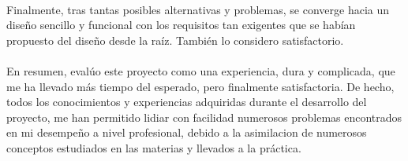 \paragraph{}
Finalmente, tras tantas posibles alternativas y problemas, se converge hacia un diseño sencillo y funcional con los requisitos tan exigentes que se habían propuesto del diseño desde la raíz. 
Tambi\'en lo considero satisfactorio.

\paragraph{}
En resumen, eval\'uo este proyecto como una experiencia, dura y complicada, que me ha llevado m\'as tiempo del esperado, pero finalmente satisfactoria. 
De hecho, todos los conocimientos y experiencias adquiridas durante el desarrollo del proyecto, me han permitido lidiar con facilidad numerosos problemas encontrados en mi desempeño a nivel profesional, debido a la asimilacion de numerosos conceptos estudiados en las materias y llevados a la pr\'actica.
